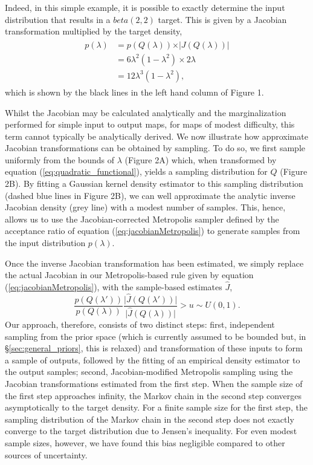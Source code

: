 \documentclass[10pt,letterpaper]{article}
\begin{document}
Indeed, in this simple example, it is possible to exactly determine the input distribution that results in a $beta(2,2)$ target. This is given by a Jacobian transformation multiplied by the target density,
%
\begin{equation}
\begin{gathered}\begin{aligned}
p(\lambda) &= p(Q(\lambda)) \times \vert J(Q(\lambda)) \vert   \\
           &= 6 \lambda^2 (1 - \lambda^2) \times 2 \lambda     \\
           & = 12 \lambda^3 (1- \lambda^2),
\end{aligned} \end{gathered}
\end{equation}
%
which is shown by the black lines in the left hand column of Figure 1.

Whilst the Jacobian may be calculated analytically and the marginalization performed for simple input to output maps, for maps of modest difficulty, this term cannot typically be analytically derived. We now illustrate how approximate Jacobian transformations can be obtained by sampling. To do so, we first sample uniformly from the bounds of $\lambda$ (Figure 2A) which, when transformed by equation (\ref{eq:quadratic_functional}), yields a sampling distribution for $Q$ (Figure 2B). By fitting a Gaussian kernel density estimator to this sampling distribution (dashed blue lines in Figure 2B), we can well approximate the analytic inverse Jacobian density (grey line) with a modest number of samples. This, hence, allows us to use the Jacobian-corrected Metropolis sampler defined by the acceptance ratio of equation (\ref{eq:jacobianMetropolis}) to generate samples from the input distribution $p(\lambda)$.

Once the inverse Jacobian transformation has been estimated, we simply replace the actual Jacobian in our Metropolis-based rule given by equation (\ref{eq:jacobianMetropolis}), with the sample-based estimates $\hat{J}$,
%
\begin{equation}\label{eq:jacobianMetropolisBySampling}
\frac{p(Q(\lambda'))}{p(Q(\lambda))}\frac{\vert \hat{J}(Q(\lambda')) \vert}{\vert \hat{J}(Q(\lambda)) \vert}>u\sim U(0,1).
\end{equation}
%
Our approach, therefore, consists of two distinct steps: first, independent sampling from the prior space (which is currently assumed to be bounded but, in \S \ref{sec:general_priors}, this is relaxed) and transformation of these inputs to form a sample of outputs, followed by the fitting of an empirical density estimator to the output samples; second, Jacobian-modified Metropolis sampling using the Jacobian transformations estimated from the first step. When the sample size of the first step approaches infinity, the Markov chain in the second step converges asymptotically to the target density. For a finite sample size for the first step, the sampling distribution of the Markov chain in the second step does not exactly converge to the target distribution due to Jensen's inequality. For even modest sample sizes, however, we have found this bias negligible compared to other sources of uncertainty.
\end{document}
